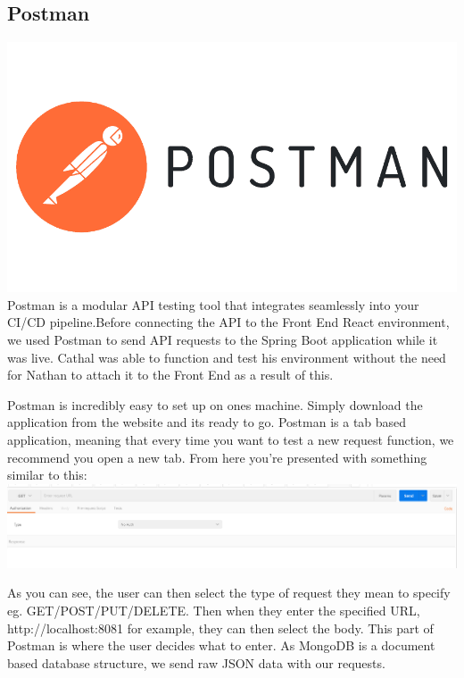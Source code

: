 \subsection{Postman}
\includegraphics[scale=0.4]{img/postman-inc-logo-vector.png} \newline
Postman is a modular API testing tool that integrates seamlessly into your CI/CD pipeline.Before connecting the API to the Front End React environment, we used Postman to send API requests to the Spring Boot application while it was live. Cathal was able to function and test his environment without the need for Nathan to attach it to the Front End as a result of this. \par
Postman is incredibly easy to set up on ones machine. Simply download the application from the website and its ready to go. Postman is a tab based application, meaning that every time you want to test a new request function, we recommend you open a new tab. From here you're presented with something similar to this: \newline
\includegraphics[scale=0.4]{img/postman-tab.PNG}\newline
\par As you can see, the user can then select the type of request they mean to specify eg. GET/POST/PUT/DELETE. Then when they enter the specified URL, http://localhost:8081 for example, they can then select the body. This part of Postman is where the user decides what to enter. As MongoDB is a document based database structure, we send raw JSON data with our requests. \newline
